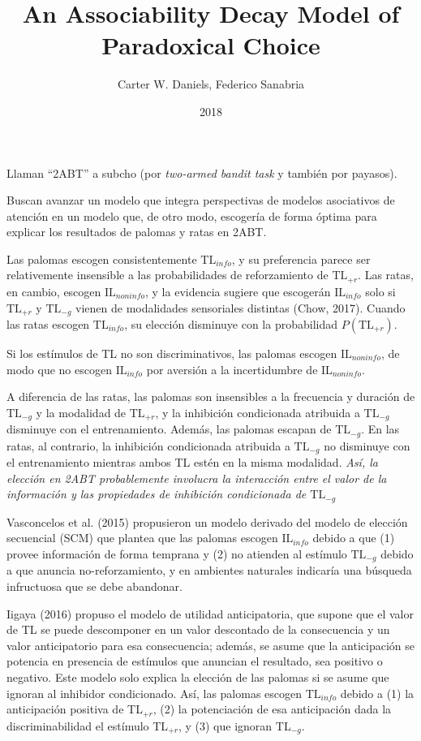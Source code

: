\documentclass[a4paper,12pt]{article}
\title{An Associability Decay Model of Paradoxical Choice}
\author{Carter W. Daniels, Federico Sanabria}
\date{2018}
\begin{document}
{\scshape\bfseries \maketitle}

Llaman ``2ABT'' a subcho (por {\itshape two-armed bandit task} y también por payasos).

Buscan avanzar un modelo que integra perspectivas de modelos asociativos de atención en un modelo que, de otro modo, escogería de forma óptima para explicar los resultados de palomas y ratas en 2ABT.

Las palomas escogen consistentemente $\mbox{TL}_{info}$, y su preferencia parece ser relativemente insensible a las probabilidades de reforzamiento de $\mbox{TL}_{+r}$. Las ratas, en cambio, escogen $\mbox{IL}_{noninfo}$, y la evidencia sugiere que escogerán $\mbox{IL}_{info}$ solo si $\mbox{TL}_{+r}$ y $\mbox{TL}_{-g}$ vienen de modalidades sensoriales distintas (Chow, 2017). Cuando las ratas escogen $\mbox{TL}_{info}$, su elección disminuye con la probabilidad $P(\mbox{TL}_{+r})$.

Si los estímulos de TL no son discriminativos, las palomas escogen $\mbox{IL}_{noninfo}$, de modo que no escogen $\mbox{IL}_{info}$ por aversión a la incertidumbre de $\mbox{IL}_{noninfo}$.

A diferencia de las ratas, las palomas son insensibles a la frecuencia y duración de $\mbox{TL}_{-g}$ y la modalidad de $\mbox{TL}_{+r}$, y la inhibición condicionada atribuida a $\mbox{TL}_{-g}$ disminuye con el entrenamiento. Además, las palomas escapan de $\mbox{TL}_{-g}$. En las ratas, al contrario, la inhibición condicionada atribuida a $\mbox{TL}_{-g}$ no disminuye con el entrenamiento mientras ambos TL estén en la misma modalidad. {\itshape Así, la elección en 2ABT probablemente involucra la interacción entre el valor de la información y las propiedades de inhibición condicionada de $\mbox{TL}_{-g}$}

Vasconcelos et al. (2015) propusieron un modelo derivado del modelo de elección secuencial (SCM) que plantea que las palomas escogen $\mbox{IL}_{info}$ debido a que (1) provee información de forma temprana y (2) no atienden al estímulo $\mbox{TL}_{-g}$ debido a que anuncia no-reforzamiento, y en ambientes naturales indicaría una búsqueda infructuosa que se debe abandonar.

Iigaya (2016) propuso el modelo de utilidad anticipatoria, que supone que el valor de TL se puede descomponer en un valor descontado de la consecuencia y un valor anticipatorio para esa consecuencia; además, se asume que la anticipación se potencia en presencia de estímulos que anuncian el resultado, sea positivo o negativo. Este modelo solo explica la elección de las palomas si se asume que ignoran al inhibidor condicionado. Así, las palomas escogen $\mbox{TL}_{info}$ debido a (1) la anticipación positiva de TL$_{+r}$, (2) la potenciación de esa anticipación dada la discriminabilidad el estímulo TL$_{+r}$, y (3) que ignoran TL$_{-g}$.
\end{document}
